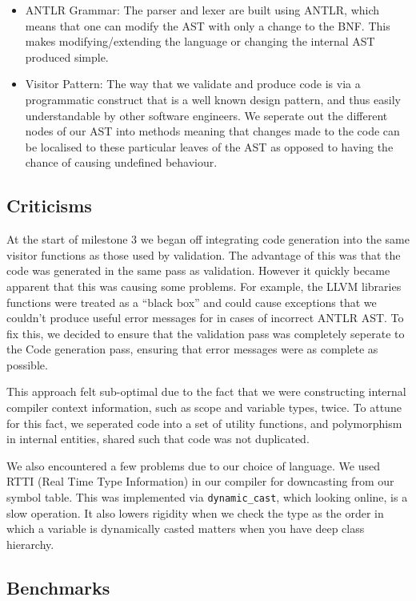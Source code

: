 \documentclass[a4wide, 11pt]{article}
\begin{document}
\begin{itemize}
\item
ANTLR Grammar: The parser and lexer are built using ANTLR, which means that one can modify the AST with only a change to the BNF. This makes modifying/extending the language or changing the internal AST produced simple.
\item
Visitor Pattern: The way that we validate and produce code is via a programmatic construct that is a well known design pattern, and thus easily understandable by other software engineers. We seperate out the different nodes of our AST into methods meaning that changes made to the code can be localised to these particular leaves of the AST as opposed to having the chance of causing undefined behaviour. 
\end{itemize}

\subsection{Criticisms}

At the start of milestone 3 we began off integrating code generation into the same visitor functions as those used by validation. The advantage of this was that the code was generated in the same pass as validation. However it quickly became apparent that this was causing some problems. For example, the LLVM libraries functions were treated as a ``black box'' and could cause exceptions that we couldn't produce useful error messages for in cases of incorrect ANTLR AST. To fix this, we decided to ensure that the validation pass was completely seperate to the Code generation pass, ensuring that error messages were as complete as possible.

This approach felt sub-optimal due to the fact that we were constructing internal compiler context information, such as scope and variable types, twice. To attune for this fact, we seperated code into a set of utility functions, and polymorphism in internal entities, shared such that code was not duplicated.

We also encountered a few problems due to our choice of language. We used RTTI (Real Time Type Information) in our compiler for downcasting from our symbol table. This was implemented via \texttt{dynamic\_cast}, which looking online, is a slow operation. It also lowers rigidity when we check the type as the order in which a variable is dynamically casted matters when you have deep class hierarchy.

\subsection{Benchmarks}
\end{document}
